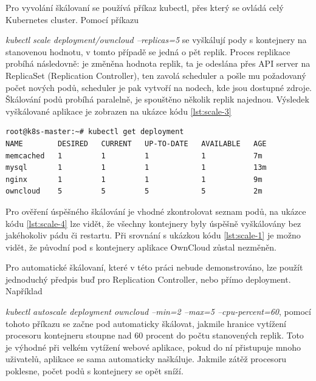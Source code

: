 Pro vyvolání škálovaní se používá příkaz kubectl, přes který se ovládá celý Kubernetes cluster. Pomocí příkazu {\textit{kubectl scale deployment/owncloud --replicas=5} se vyškálují pody s kontejnery na stanovenou hodnotu, v tomto případě se jedná o pět replik. Proces replikace probíhá následovně: je změněna hodnota replik, ta je odeslána přes API server na ReplicaSet (Replication Controller), ten zavolá scheduler a pošle mu požadovaný počet nových podů, scheduler je pak vytvoří na nodech, kde jsou dostupné zdroje. Škálování podů probíhá paralelně, je spouštěno několik replik najednou. Výsledek vyškálované aplikace je zobrazen na ukázce kódu \ref{lst:scale-3}

\begin{lstlisting}[caption={Ukázka škálování, čast 3},label= {lst:scale-3}]
root@k8s-master:~# kubectl get deployment  
NAME        DESIRED   CURRENT   UP-TO-DATE   AVAILABLE   AGE
memcached   1         1         1            1           7m
mysql       1         1         1            1           13m
nginx       1         1         1            1           9m
owncloud    5         5         5            5           2m
\end{lstlisting}

Pro ověření úspěšného škálování je vhodné zkontrolovat seznam podů, na ukázce kódu \ref{lst:scale-4} lze vidět, že všechny kontejnery byly úspěšně vyškálovány bez jakéhokoliv pádu či restartu. Při srovnání s ukázkou kódu \ref{lst:scale-1} je možno vidět, že původní pod s kontejnery aplikace OwnCloud zůstal nezměněn. 

Pro automatické škálovaní, které v této práci nebude demonstrováno, lze použít jednoduchý předpis buď pro Replication Controller, nebo přímo deployment. Například {\textit{kubectl autoscale deployment owncloud --min=2 --max=5 --cpu-percent=60}, pomocí tohoto příkazu se začne pod automaticky škálovat, jakmile hranice vytížení procesoru kontejneru stoupne nad 60 procent do počtu stanovených replik. Toto je výhodné při velkém vytížení webové aplikace, pokud do ní přistupuje mnoho uživatelů, aplikace se sama automaticky naškáluje. Jakmile zátěž procesoru poklesne, počet podů s kontejnery se opět sníží.

}}
